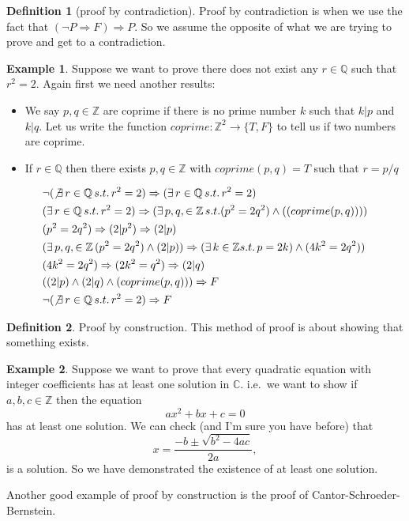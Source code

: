 \documentclass[
]{book}
\theoremstyle{definition}
\newtheorem{definition}{Definition}[chapter]
\theoremstyle{definition}
\newtheorem{example}{Example}[chapter]
\theoremstyle{definition}
\theoremstyle{definition}
\theoremstyle{remark}
\begin{document}
\begin{definition}[proof by contradiction]
Proof by contradiction is when we use the fact that \((\neg P \Rightarrow F) \Rightarrow P\). So we assume the opposite of what we are trying to prove and get to a contradiction.
\end{definition}

\begin{example}
Suppose we want to prove there does not exist any \(r \in \mathbb{Q}\) such that \(r^2=2\).
Again first we need another results:

\begin{itemize}
\item
  We say \(p,q \in \mathbb{Z}\) are coprime if there is no prime number \(k\) such that \(k|p\) and \(k|q\). Let us write the function \(coprime: \mathbb{Z}^2 \rightarrow \{T,F\}\) to tell us if two numbers are coprime.
\item
  If \(r \in \mathbb{Q}\) then there exists \(p,q \in \mathbb{Z}\) with \(coprime(p,q) =T\) such that \(r=p/q\)
\end{itemize}

\begin{align*}
&\neg(\not\exists \, r \in \mathbb{Q} \, s.t. \, r^2 =2) \Rightarrow (\exists \, r \in \mathbb{Q} \, s.t. \, r^2 = 2)\\
&(\exists \, r \in \mathbb{Q} \, s.t. \, r^2 = 2) \Rightarrow (\exists \, p, q, \in \mathbb{Z} \, s.t. (p^2 = 2 q^2)\wedge((coprime(p,q)))) \\
&( p^2 = 2 q^2)  \Rightarrow (2|p^2) \Rightarrow (2|p) \\
& (\exists \, p, q, \in \mathbb{Z} \, (p^2 = 2 q^2)\wedge(2|p)) \Rightarrow (\exists \, k \in \mathbb{Z} s.t.\, p=2k)\wedge(4k^2=2q^2) )\\
&(4k^2=2q^2) \Rightarrow (2k^2 = q^2) \Rightarrow (2|q)\\
&((2|p)\wedge(2|q)\wedge (coprime(p,q))) \Rightarrow F\\
&\neg(\not\exists \, r \in \mathbb{Q} \, s.t. \, r^2 =2) \Rightarrow F
\end{align*}
\end{example}

\begin{definition}
Proof by construction. This method of proof is about showing that something exists.
\end{definition}

\begin{example}
Suppose we want to prove that every quadratic equation with integer coefficients has at least one solution in \(\mathbb{C}\). i.e.~we want to show if \(a,b,c \in \mathbb{Z}\) then the equation \[ ax^2+bx+c = 0 \] has at least one solution. We can check (and I'm sure you have before) that
\[ x = \frac{-b\pm \sqrt{b^2-4ac}}{2a},  \] is a solution. So we have demonstrated the existence of at least one solution.

Another good example of proof by construction is the proof of Cantor-Schroeder-Bernstein.
\end{example}
\end{document}
